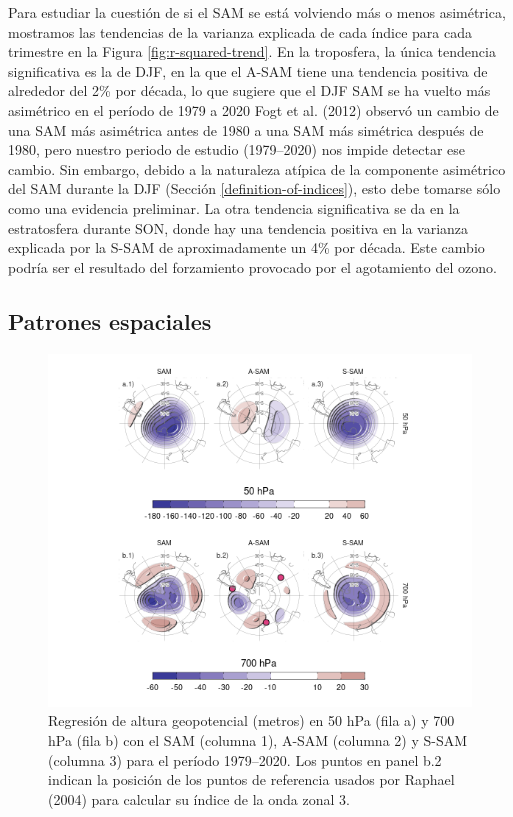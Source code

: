 \documentclass[12pt,oneside]{reedthesis}
\begin{document}
Para estudiar la cuestión de si el SAM se está volviendo más o menos asimétrica, mostramos las tendencias de la varianza explicada de cada índice para cada trimestre en la Figura \ref{fig:r-squared-trend}.
En la troposfera, la única tendencia significativa es la de DJF, en la que el A-SAM tiene una tendencia positiva de alrededor del 2\% por década, lo que sugiere que el DJF SAM se ha vuelto más asimétrico en el período de 1979 a 2020 Fogt et al. (2012) observó un cambio de una SAM más asimétrica antes de 1980 a una SAM más simétrica después de 1980, pero nuestro periodo de estudio (1979--2020) nos impide detectar ese cambio.
Sin embargo, debido a la naturaleza atípica de la componente asimétrico del SAM durante la DJF (Sección \ref{definition-of-indices}), esto debe tomarse sólo como una evidencia preliminar.
La otra tendencia significativa se da en la estratosfera durante SON, donde hay una tendencia positiva en la varianza explicada por la S-SAM de aproximadamente un 4\% por década.
Este cambio podría ser el resultado del forzamiento provocado por el agotamiento del ozono.

\hypertarget{spatial}{%
\subsection{Patrones espaciales}\label{spatial}}



\begin{figure}
\includegraphics{figures/30-sam/2d-regr-1} \caption{Regresión de altura geopotencial (metros) en 50 hPa (fila a) y 700 hPa (fila b) con el SAM (columna 1), A-SAM (columna 2) y S-SAM (columna 3) para el período 1979--2020. Los puntos en panel b.2 indican la posición de los puntos de referencia usados por Raphael (2004) para calcular su índice de la onda zonal 3.}\label{fig:2d-regr}
\end{figure}
\end{document}
